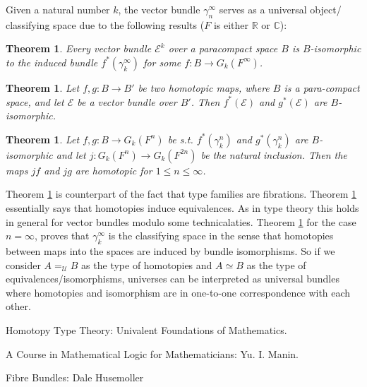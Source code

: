 \documentclass[10pt]{article}
\theoremstyle{definition}
\theoremstyle{plain}
\newtheorem{theorem}[definition]{Theorem}
\theoremstyle{remark}
\newcommand{\U}{\mathscr{U}}
\begin{document}
Given a natural number $k$, the vector bundle $\gamma^{\infty }_n$ serves as a universal object/
classifying space due to the following results ($F$ is either $\mathbb{R}$ or $\mathbb{C}$):

\begin{theorem}\label{T:Ind}
Every vector bundle $\mathscr{E}^k$ over a paracompact space $B$ is $B$-isomorphic
to the induced bundle $f^*(\gamma^{\infty}_k)$ for some ${f : B \to G_k (F^{ \infty })}$.
\end{theorem}

\begin{theorem}\label{T:Hom to Eq}
Let $f, g: B \to B'$ be two homotopic maps, where $B$ is a para-compact space, 
and let $\mathscr{E}$ be a vector bundle over $B'$. Then $f^*(\mathscr{E})$ and 
$g^*(\mathscr{E})$ are $B$-isomorphic.
\end{theorem}

\begin{theorem}\label{T:Eq to Hom}
Let $f, g: B \to G_k(F^n)$ be s.t. $f^*(\gamma_k^n)$ and $g^*(\gamma_k^n)$
are $B$-isomorphic and let ${ j: G_k(F^n) \to G_k(F^{2n}) }$ be the natural inclusion. Then the
maps $jf$ and $jg$ are homotopic for $1 \leq n \leq \infty$. 
\end{theorem}

Theorem \ref{T:Ind} is counterpart of the fact that type families are fibrations. Theorem
\ref{T:Hom to Eq} essentially says that homotopies induce equivalences. As in type theory
this holds in general for vector bundles modulo some technicalaties. Theorem \ref{T:Eq to Hom}
for the case $n = \infty$, proves that $\gamma^{\infty}_k$ is the classifying space in the 
sense that homotopies between maps into the spaces are induced by bundle isomorphisms.
So if we consider $A =_{\U} B$ as the type of homotopies and $A \simeq B$ as the type of
equivalences/isomorphisms, universes can be interpreted as universal bundles where homotopies
and isomorphism are in one-to-one correspondence with each other.
 


\begin{thebibliography}{99}

Homotopy Type Theory: Univalent Foundations of Mathematics.

A Course in Mathematical Logic for Mathematicians: Yu. I. Manin. 

Fibre Bundles: Dale Husemoller

\end{thebibliography}
\end{document}
